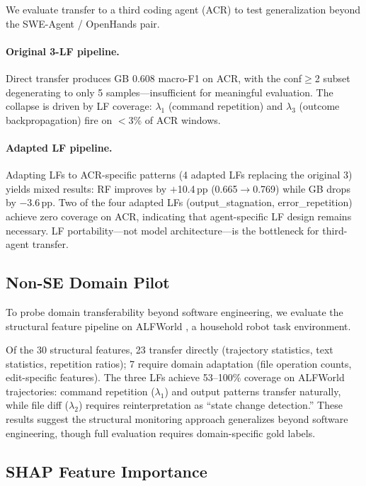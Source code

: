 We evaluate transfer to a third coding agent (ACR) to test generalization beyond the SWE-Agent / OpenHands pair.

\paragraph{Original 3-LF pipeline.}
Direct transfer produces GB 0.608 macro-F1 on ACR, with the conf${\geq}$2 subset degenerating to only 5 samples---insufficient for meaningful evaluation.
The collapse is driven by LF coverage: $\lambda_1$ (command repetition) and $\lambda_3$ (outcome backpropagation) fire on $<$3\% of ACR windows.

\paragraph{Adapted LF pipeline.}
Adapting LFs to ACR-specific patterns (4 adapted LFs replacing the original 3) yields mixed results: RF improves by $+$10.4\,pp (0.665$\to$0.769) while GB drops by $-$3.6\,pp.
Two of the four adapted LFs (output\_stagnation, error\_repetition) achieve zero coverage on ACR, indicating that agent-specific LF design remains necessary.
LF portability---not model architecture---is the bottleneck for third-agent transfer.

\subsection{Non-SE Domain Pilot}
\label{sec:app_nonse}

To probe domain transferability beyond software engineering, we evaluate the structural feature pipeline on ALFWorld \citep{yao2023react}, a household robot task environment.

Of the 30 structural features, 23 transfer directly (trajectory statistics, text statistics, repetition ratios); 7 require domain adaptation (file operation counts, edit-specific features).
The three LFs achieve 53--100\% coverage on ALFWorld trajectories: command repetition ($\lambda_1$) and output patterns transfer naturally, while file diff ($\lambda_2$) requires reinterpretation as ``state change detection.''
These results suggest the structural monitoring approach generalizes beyond software engineering, though full evaluation requires domain-specific gold labels.

\subsection{SHAP Feature Importance}
\label{sec:app_shap}

